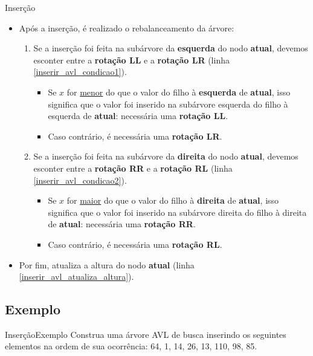 \documentclass[aspectratio=169]{beamer}
\begin{document}
\begin{frame}{Inserção}
\begin{itemize}
 \item Após a inserção, é realizado o rebalanceamento da árvore:
 \begin{enumerate}
  \item Se a inserção foi feita na subárvore da {\bf esquerda} do nodo {\bf atual}, devemos esconter entre a {\bf rotação LL} e a {\bf rotação LR} (linha \ref{inserir_avl_condicao1}).
  \begin{itemize}
  \item Se $x$ for \underline{menor} do que o valor do filho à {\bf esquerda} de {\bf atual}, isso significa que o valor foi inserido na subárvore esquerda do filho à esquerda de {\bf atual}: necessária uma {\bf rotação LL}.
  \item Caso contrário, é necessária uma {\bf rotação LR}.
  \end{itemize}
  \item Se a inserção foi feita na subárvore da {\bf direita} do nodo {\bf atual}, devemos esconter entre a {\bf rotação RR} e a {\bf rotação RL} (linha \ref{inserir_avl_condicao2}).
  \begin{itemize}
  \item Se $x$ for \underline{maior} do que o valor do filho à {\bf direita} de {\bf atual}, isso significa que o valor foi inserido na subárvore direita do filho à direita de {\bf atual}: necessária uma {\bf rotação RR}.
  \item Caso contrário, é necessária uma {\bf rotação RL}.
  \end{itemize}  
 \end{enumerate}
\item Por fim, atualiza a altura do nodo {\bf atual} (linha \ref{inserir_avl_atualiza_altura}).
\end{itemize}
\end{frame}


\subsection{Exemplo}

\begin{frame}{Inserção}{Exemplo}
Construa uma árvore AVL de busca inserindo os seguintes elementos na ordem de sua ocorrência: 64, 1, 14, 26, 13, 110, 98, 85.
\end{frame}
\end{document}
